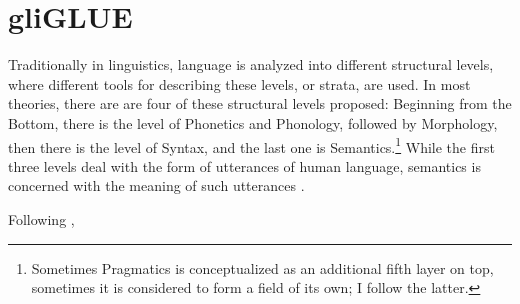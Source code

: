 
\label{chap:5_dataset}

\section{gliGLUE}

Traditionally in linguistics, language is analyzed into different structural levels, where different tools for describing these levels, or strata, are used.
In most theories, there are are four of these structural levels proposed:
Beginning from the Bottom, there is the level of Phonetics and Phonology, followed by Morphology, then there is the level of Syntax, and the last one is Semantics.\footnote{Sometimes Pragmatics is conceptualized as an additional fifth layer on top, sometimes it is considered to form a field of its own; I follow the latter.}
While the first three levels deal with the form of utterances of human language, semantics is concerned with the meaning of such utterances \citep[p.~4ff.]{kracht2007introduction}.



Following \cite{wang2018glue}, 

